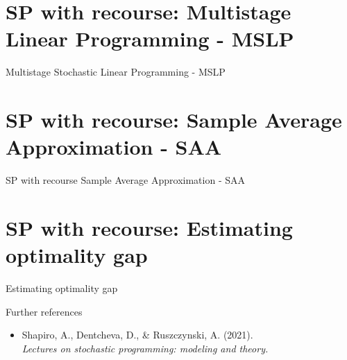 \documentclass[slidstop,compress,8pt]{beamer}
\begin{document}
\section{SP with recourse: Multistage Linear Programming - MSLP}
\begin{frame}{ }
\begin{block}{\Large Multistage Stochastic Linear Programming - MSLP}
\end{block}
\end{frame}



\section{SP with recourse: Sample Average Approximation - SAA}
\begin{frame}{ }
\begin{block}{\Large SP with recourse}
 Sample Average Approximation - SAA
\end{block}
\end{frame}


\section{SP with recourse: Estimating optimality gap}

\begin{frame}{ }
\begin{block}{\Large Estimating optimality gap}
\end{block}
\end{frame}

%

\begin{frame}{Further references}
  \begin{itemize}
    \item Shapiro, A., Dentcheva, D., \& Ruszczynski, A. (2021).\\
      \emph{Lectures on stochastic programming: modeling and theory.}
  \end{itemize}
\end{frame}
\end{document}
